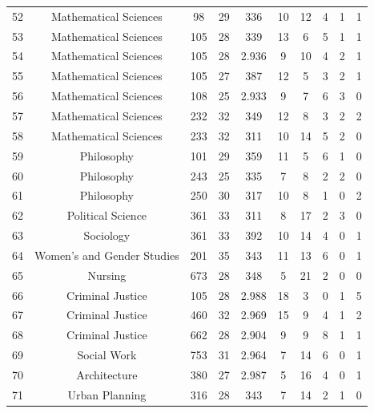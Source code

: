 \documentclass[12pt,letterpaper,oneside,openany]{book}
\renewcommand{\bibname}{\begin{center}{\bf \sc \Large Bibliography}\end{center}}
\begin{document}
\begin{center}
\begin{longtable}{c||ccccccccc}
		52 & Mathematical Sciences           & 98    & 29                & 336 & 10 & 12 & 4 & 1 & 1 \\
		53 & Mathematical Sciences           & 105   & 28                & 339 & 13 & 6  & 5 & 1 & 1 \\
		54 & Mathematical Sciences           & 105   & 28                & 2.936 & 9  & 10 & 4 & 2 & 1 \\
		55 & Mathematical Sciences           & 105   & 27                & 387 & 12 & 5  & 3 & 2 & 1 \\
		56 & Mathematical Sciences           & 108   & 25                & 2.933 & 9  & 7  & 6 & 3 & 0 \\
		57 & Mathematical Sciences           & 232   & 32                & 349 & 12 & 8  & 3 & 2 & 2 \\
		58 & Mathematical Sciences           & 233   & 32                & 311 & 10 & 14 & 5 & 2 & 0 \\
		59 & Philosophy                      & 101   & 29                & 359 & 11 & 5  & 6 & 1 & 0 \\
		60 & Philosophy                      & 243   & 25                & 335 & 7  & 8  & 2 & 2 & 0 \\
		61 & Philosophy                      & 250   & 30                & 317 & 10 & 8  & 1 & 0 & 2 \\
		62 & Political Science               & 361   & 33                & 311 & 8  & 17 & 2 & 3 & 0 \\
		63 & Sociology                       & 361   & 33                & 392 & 10 & 14 & 4 & 0 & 1 \\
		64 & Women's and Gender Studies      & 201   & 35                & 343 & 11 & 13 & 6 & 0 & 1 \\
		65 & Nursing                         & 673   & 28                & 348 & 5  & 21 & 2 & 0 & 0 \\
		66 & Criminal Justice                & 105   & 28                & 2.988 & 18 & 3  & 0 & 1 & 5 \\
		67 & Criminal Justice                & 460   & 32                & 2.969 & 15 & 9  & 4 & 1 & 2 \\
		68 & Criminal Justice                & 662   & 28                & 2.904 & 9  & 9  & 8 & 1 & 1 \\
		69 & Social Work                     & 753   & 31                & 2.964 & 7  & 14 & 6 & 0 & 1 \\
		70 & Architecture                    & 380   & 27                & 2.987 & 5  & 16 & 4 & 0 & 1 \\
		71 & Urban Planning                  & 316   & 28                & 343 & 7  & 14 & 2 & 1 & 0
	\end{longtable}
\end{center}



%

\singlespace



\end{document}
